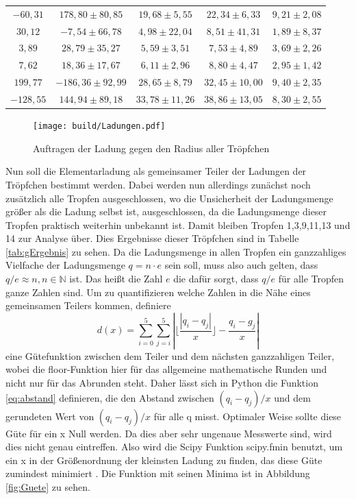 \begin{table}[H]
\begin{tabular}{c c c c c }
        $-60,31$ & $178,80 \pm 80,85$ & $19,68 \pm 5,55$ & $22,34 \pm 6,33$ & $9,21 \pm 2,08$ \\
        $30,12$ & $-7,54 \pm 66,78$ & $4,98 \pm 22,04$ & $8,51 \pm 41,31$ & $1,89 \pm 8,37$ \\
        $3,89$ & $28,79 \pm 35,27$ & $5,59 \pm 3,51$ & $7,53 \pm 4,89$ & $3,69 \pm 2,26$ \\
        $7,62$ & $18,36 \pm 17,67$ & $6,11 \pm 2,96$ & $8,80 \pm 4,47$ & $2,95 \pm 1,42$ \\
        $199,77$ & $-186,36 \pm 92,99$ & $28,65 \pm 8,79$ & $32,45 \pm 10,00$ & $9,40 \pm 2,35$ \\
        $-128,55$ & $144,94 \pm 89,18$ & $33,78 \pm 11,26$ & $38,86 \pm 13,05$ & $8,30 \pm 2,55$ \\
        \bottomrule
    \end{tabular}
\end{table}

\begin{figure}[H]
    \centering
    \texttt{[image: build/Ladungen.pdf]}
    \caption{Auftragen der Ladung gegen den Radius aller Tröpfchen}
    \label{fig:Ladung}
  \end{figure}

  \noindent Nun soll die Elementarladung als gemeinsamer Teiler der Ladungen der Tröpfchen bestimmt werden.
  Dabei werden nun allerdings zunächst noch zusätzlich alle Tropfen ausgeschlossen, wo die Unsicherheit der Ladungsmenge 
  größer als die Ladung selbst ist, ausgeschlossen, da die Ladungsmenge dieser Tropfen praktisch weiterhin unbekannt ist.
  Damit bleiben Tropfen 1,3,9,11,13 und 14 zur Analyse über. Dies Ergebnisse dieser Tröpfchen sind in Tabelle \ref{tab:gErgebnis} zu sehen.
  Da die Ladungsmenge in allen Tropfen ein ganzzahliges
  Vielfache der Ladungsmenge $q=n\cdot e$ sein soll, muss also auch gelten, dass $q/e\approx n, n \in \mathbb{N}$ ist.
  Das heißt die Zahl $e$ die dafür sorgt, dass $q/e$ für alle Tropfen ganze Zahlen sind. Um zu quantifizieren welche Zahlen in die Nähe eines gemeinsamen Teilers
  kommen, definiere
  \begin{equation}
    d(x)= \sum_{i=0}^5 \sum_{j=i}^5 \left|\lfloor \frac{|q_i-q_j|}{x}\rfloor-\frac{q_i-g_j}{x}\right|
    \label{eq:abstand}
  \end{equation}
  eine Gütefunktion zwischen dem Teiler und dem nächsten ganzzahligen Teiler, wobei die floor-Funktion hier
  für das allgemeine mathematische Runden und nicht nur für das Abrunden steht.
  Daher lässt sich in Python die Funktion \eqref{eq:abstand} definieren, die den Abstand zwischen $(q_i-q_j)/x$ und dem gerundeten Wert von $(q_i-q_j)/x$ für alle q misst.
  Optimaler Weise sollte diese Güte für ein
  x Null werden. Da dies aber sehr ungenaue Messwerte sind, wird dies nicht genau eintreffen. Also wird die Scipy Funktion scipy.fmin benutzt, um ein x in der Größenordnung der kleinsten Ladung zu finden,
  das diese Güte zumindest minimiert \cite{scipy}. Die Funktion mit seinen Minima ist in Abbildung \ref{fig:Guete} zu sehen.
  
